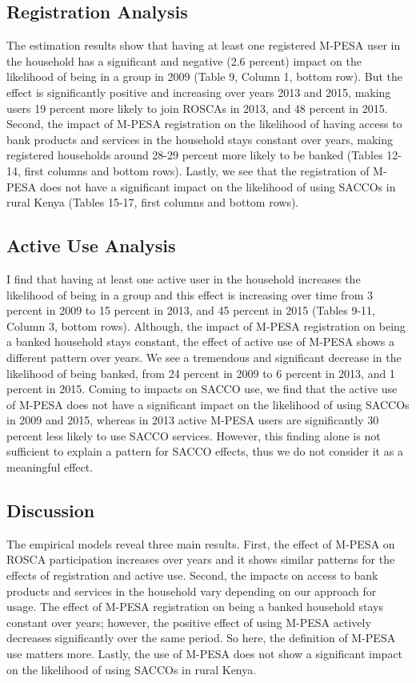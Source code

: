 \documentclass[11pt]{article}
\numberwithin{equation}{section}
\begin{document}
\subsection{Registration Analysis}

The estimation results show that having at least one registered M-PESA user in the household has a significant and negative (2.6 percent) impact on the likelihood of being in a group in 2009 (Table 9, Column 1, bottom row). But the effect is significantly positive and increasing over years 2013 and 2015, making users 19 percent more likely to join ROSCAs in 2013, and 48 percent in 2015.
Second, the impact of M-PESA registration on the likelihood of having access to bank products and services in the household stays constant over years, making registered households around 28-29 percent more likely to be banked (Tables 12-14, first columns and bottom rows).
Lastly, we see that the registration of M-PESA does not have a significant impact on the likelihood of using SACCOs in rural Kenya (Tables 15-17, first columns and bottom rows).


\subsection{Active Use Analysis}

I find that having at least one active user in the household increases the likelihood of being in a group and this effect is increasing over time from 3 percent in 2009 to 15 percent in 2013, and 45 percent in 2015 (Tables 9-11, Column 3, bottom rows). Although, the impact of M-PESA registration on being a banked household stays constant, the effect of active use of M-PESA shows a different pattern over years. We see a tremendous and significant decrease in the likelihood of being banked, from 24 percent in 2009 to 6 percent in 2013, and 1 percent in 2015. Coming to impacts on SACCO use, we find that the active use of M-PESA does not have a significant impact on the likelihood of using SACCOs in 2009 and 2015, whereas in 2013 active M-PESA users are significantly 30 percent less likely to use SACCO services. However, this finding alone is not sufficient to explain a pattern for SACCO effects, thus we do not consider it as a meaningful effect.


\subsection{Discussion}

The empirical models reveal three main results. First, the effect of M-PESA on ROSCA participation increases over years and it shows similar patterns for the effects of registration and active use. Second, the impacts on access to bank products and services in the household vary depending on our approach for usage. The effect of M-PESA registration on being a banked household stays constant over years; however, the positive effect of using M-PESA actively decreases significantly over the same period. So here, the definition of M-PESA use matters more. Lastly, the use of M-PESA does not show a significant impact on the likelihood of using SACCOs in rural Kenya.
\end{document}

